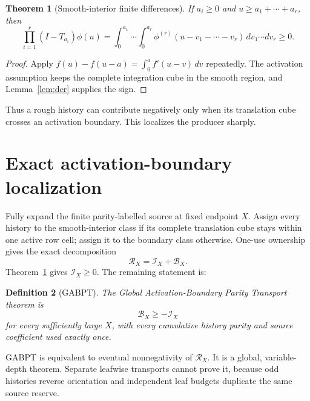 \documentclass[11pt]{article}
\newtheorem{theorem}{Theorem}[section]
\newtheorem{definition}[theorem]{Definition}
\newcommand{\1}{\mathbf 1}
\newcommand{\RR}{\mathcal R}
\newcommand{\BB}{\mathcal B}
\newcommand{\II}{\mathcal I}
\begin{document}
\begin{theorem}[Smooth-interior finite differences]\label{thm:interior}
If \(a_i\ge0\) and \(u\ge a_1+\cdots+a_r\), then
\[
\prod_{i=1}^r(I-T_{a_i})\phi(u)
=\int_0^{a_1}\!\cdots\!\int_0^{a_r}
\phi^{(r)}(u-v_1-\cdots-v_r)\,dv_1\cdots dv_r\ge0.
\]
\end{theorem}
\begin{proof}
Apply \(f(u)-f(u-a)=\int_0^a f'(u-v)\,dv\) repeatedly. The activation
assumption keeps the complete integration cube in the smooth region, and
Lemma~\ref{lem:der} supplies the sign.
\end{proof}

Thus a rough history can contribute negatively only when its translation cube
crosses an activation boundary. This localizes the producer sharply.

\section{Exact activation-boundary localization}
Fully expand the finite parity-labelled source at fixed endpoint \(X\). Assign
every history to the smooth-interior class if its complete translation cube
stays within one active row cell; assign it to the boundary class otherwise.
One-use ownership gives the exact decomposition
\begin{equation}\label{eq:IB}
\RR_X=\II_X+\BB_X.
\end{equation}
Theorem~\ref{thm:interior} gives \(\II_X\ge0\). The remaining statement is:

\begin{definition}[GABPT]
The Global Activation-Boundary Parity Transport theorem is
\[
\BB_X\ge-\II_X
\]
for every sufficiently large \(X\), with every cumulative history parity and
source coefficient used exactly once.
\end{definition}

GABPT is equivalent to eventual nonnegativity of \(\RR_X\). It is a global,
variable-depth theorem. Separate leafwise transports cannot prove it, because
odd histories reverse orientation and independent leaf budgets duplicate the
same source reserve.
\end{document}
